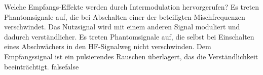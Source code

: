     {Welche Empfangs-Effekte werden durch Intermodulation hervorgerufen?}
    {Es treten Phantomsignale auf, die bei Abschalten einer der beteiligten Mischfrequenzen verschwindet.}
    {Das Nutzsignal wird mit einem anderen Signal moduliert und dadurch verständlicher.}
    {Es treten Phantomsignale auf, die selbst bei Einschalten eines Abschwächers in den HF-Signalweg nicht verschwinden.}
    {Dem Empfangssignal ist ein pulsierendes Rauschen überlagert, das die Verständlichkeit beeinträchtigt.}
    {false}{false}